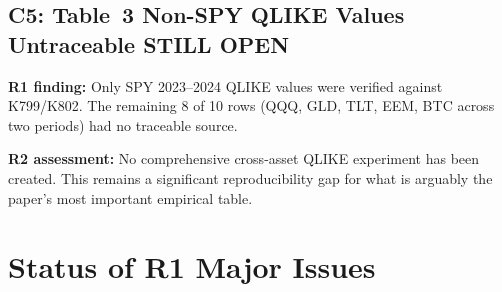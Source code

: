 \documentclass[12pt,a4paper]{article}
\begin{document}
\subsection*{C5: Table~3 Non-SPY QLIKE Values Untraceable \hfill \textcolor{errorred}{STILL OPEN}}

\textbf{R1 finding:} Only SPY 2023--2024 QLIKE values were verified against K799/K802. The remaining 8 of 10 rows (QQQ, GLD, TLT, EEM, BTC across two periods) had no traceable source.

\textbf{R2 assessment:} No comprehensive cross-asset QLIKE experiment has been created. This remains a significant reproducibility gap for what is arguably the paper's most important empirical table.


\bigskip

\section*{Status of R1 Major Issues}
\end{document}
